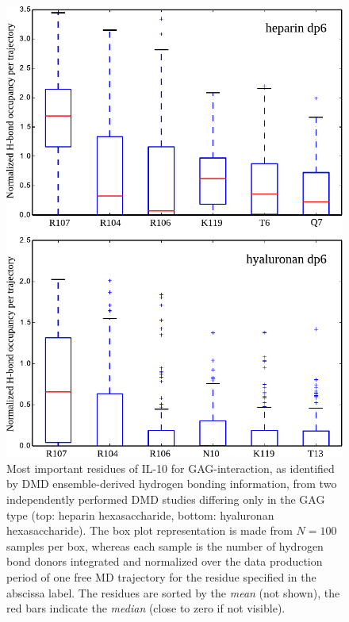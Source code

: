 \begin{figure}
\centering
\includegraphics[width=1.0\textwidth]{gfx/dmdil10/round1_il10_hbond_hadp6_vs_hpdp6.pdf}
\caption[]{Most important residues of IL-10 for GAG-interaction, as identified
by DMD ensemble-derived hydrogen bonding information, from two independently
performed DMD studies differing only in the GAG type (top: heparin
hexasaccharide, bottom: hyaluronan hexasaccharide). The box plot representation
is made from  $N=100$ samples per box, whereas each sample is the number of
hydrogen bond donors integrated and normalized over the data production period
of one free MD trajectory for the residue specified in the abscissa label. The
residues are sorted by the \textit{mean} (not shown), the red bars indicate the
\textit{median} (close to zero if not visible).}
\label{fig:dmdil10:hp_hexa_vs_ha_hexa_hbond}
\end{figure}


